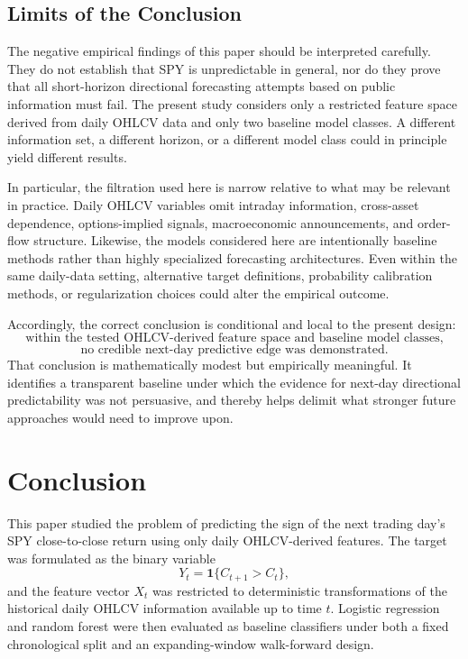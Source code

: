 \documentclass[11pt,a4paper]{article}
\begin{document}
	\subsection{Limits of the Conclusion}
	
	The negative empirical findings of this paper should be interpreted carefully. They do not establish that SPY is unpredictable in general, nor do they prove that all short-horizon directional forecasting attempts based on public information must fail. The present study considers only a restricted feature space derived from daily OHLCV data and only two baseline model classes. A different information set, a different horizon, or a different model class could in principle yield different results.
	
	In particular, the filtration used here is narrow relative to what may be relevant in practice. Daily OHLCV variables omit intraday information, cross-asset dependence, options-implied signals, macroeconomic announcements, and order-flow structure. Likewise, the models considered here are intentionally baseline methods rather than highly specialized forecasting architectures. Even within the same daily-data setting, alternative target definitions, probability calibration methods, or regularization choices could alter the empirical outcome.
	
	Accordingly, the correct conclusion is conditional and local to the present design:
	\[
	\text{within the tested OHLCV-derived feature space and baseline model classes,}
	\]
	\[
	\text{no credible next-day predictive edge was demonstrated.}
	\]
	That conclusion is mathematically modest but empirically meaningful. It identifies a transparent baseline under which the evidence for next-day directional predictability was not persuasive, and thereby helps delimit what stronger future approaches would need to improve upon.
	
	\section{Conclusion}
	
	This paper studied the problem of predicting the sign of the next trading day's SPY close-to-close return using only daily OHLCV-derived features. The target was formulated as the binary variable
	\[
	Y_t = \mathbf{1}\{C_{t+1} > C_t\},
	\]
	and the feature vector \(X_t\) was restricted to deterministic transformations of the historical daily OHLCV information available up to time \(t\). Logistic regression and random forest were then evaluated as baseline classifiers under both a fixed chronological split and an expanding-window walk-forward design.
	
\end{document}
